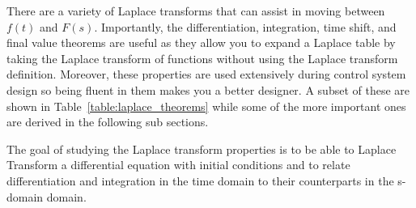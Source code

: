 \documentclass[12pt,letter]{article}
\begin{document}
There are a variety of Laplace transforms that can assist in moving between $f(t)$ and $F(s)$. Importantly, the differentiation, integration, time shift, and final value theorems are useful as they allow you to expand a Laplace table by taking the Laplace transform of functions without using the Laplace transform definition. Moreover, these properties are used extensively during control system design so being fluent in them makes you a better designer. A subset of these are shown in Table~\ref{table:laplace_theorems} while some of the more important ones are derived in the following sub sections. 

The goal of studying the Laplace transform properties is to be able to Laplace Transform a differential equation with initial conditions and to relate differentiation and integration in the time domain to their counterparts in the s-domain domain. 
\end{document}
